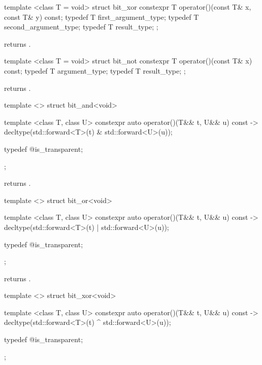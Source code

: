 %
\begin{itemdecl}
template <class T = void> struct bit_xor {
  constexpr T operator()(const T& x, const T& y) const;
  typedef T first_argument_type;
  typedef T second_argument_type;
  typedef T result_type;
};
\end{itemdecl}

\begin{itemdescr}
\pnum
{} returns .
\end{itemdescr}

\begin{itemdecl}
template <class T = void> struct bit_not {
  constexpr T operator()(const T& x) const;
  typedef T argument_type;
  typedef T result_type;
};
\end{itemdecl}

\begin{itemdescr}
\pnum
{} returns .
\end{itemdescr}

%
\begin{itemdecl}
template <> struct bit_and<void> {
  template <class T, class U> constexpr auto operator()(T&& t, U&& u) const
    -> decltype(std::forward<T>(t) & std::forward<U>(u));

  typedef @\unspec@ is_transparent;
};
\end{itemdecl}

\begin{itemdescr}
\pnum
{} returns .
\end{itemdescr}

%
\begin{itemdecl}
template <> struct bit_or<void> {
  template <class T, class U> constexpr auto operator()(T&& t, U&& u) const
    -> decltype(std::forward<T>(t) | std::forward<U>(u));

  typedef @\unspec@ is_transparent;
};
\end{itemdecl}

\begin{itemdescr}
\pnum
{} returns .
\end{itemdescr}

%
\begin{itemdecl}
template <> struct bit_xor<void> {
  template <class T, class U> constexpr auto operator()(T&& t, U&& u) const
    -> decltype(std::forward<T>(t) ^ std::forward<U>(u));

  typedef @\unspec@ is_transparent;
};
\end{itemdecl}

